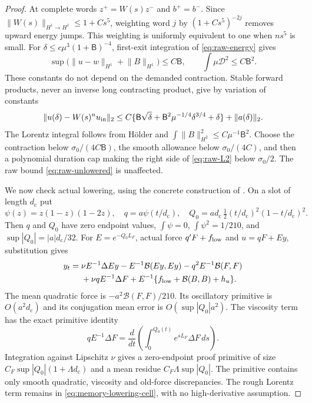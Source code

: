 \documentclass[11pt,a4paper]{amsart}
\theoremstyle{definition}
\theoremstyle{remark}
\numberwithin{equation}{section}
\newcommand{\Bcal}{\mathcal B}
\newcommand{\norm}[1]{\lVert #1\rVert}
\begin{document}
\begin{proof}
At complete words $z^+=W(s)z^-$ and $b^+=b^-$.  Since
$\norm{W(s)}_{H^1\to H^1}\le1+Cs^5$, weighting word $j$ by
$(1+Cs^5)^{-2j}$ removes upward energy jumps.  This weighting is uniformly
equivalent to one when $ns^5$ is small.  For
$\delta\le c\mu^3(1+\mathsf B)^{-4}$, first-exit integration of
\eqref{eq:raw-energy} gives
\begin{equation}\label{eq:raw-unlowered}
 \sup\bigl(\norm{u-w}_{H^1}+\norm B_{H^1}\bigr)\le C\mathsf B,
 \qquad\int\mu\mathcal D^2\le C\mathsf B^2.
\end{equation}
These constants do not depend on the demanded contraction.
Stable forward products, never an inverse long contracting product,
give by variation of constants
\begin{equation}\label{eq:raw-L2}
 \norm{u(\delta)-W(s)^nu_{\rm in}}_2
 \le C\{\mathsf B\sqrt\delta+
    \mathsf B^2\mu^{-1/4}\delta^{3/4}+\delta\}
          +\norm{a(\delta)}_2.
\end{equation}
The Lorentz integral follows from H\"older and
$\int\norm B_{H^2}^2\le C\mu^{-1}\mathsf B^2$.
Choose the contraction below $\sigma_0/(4C\mathsf B)$, the smooth
allowance below $\sigma_0/(4C)$, and then a polynomial duration cap making
the right side of \eqref{eq:raw-L2} below $\sigma_0/2$.
The raw bound \eqref{eq:raw-unlowered} is unaffected.

We now check actual lowering, using the concrete construction of
\cite[Section~8.6]{Common}.  On a slot of length $d_{\mathrm c}$ put
\[
 \psi(z)=z(1-z)(1-2z),\quad q=a\psi(t/d_{\mathrm c}),\quad
 Q_0=ad_{\mathrm c}\,\tfrac12(t/d_{\mathrm c})^2(1-t/d_{\mathrm c})^2.
\]
Then $q$ and $Q_0$ have zero endpoint values, $\int\psi=0$,
$\int\psi^2=1/210$, and $\sup|Q_0|=|a|d_{\mathrm c}/32$.
For $E=e^{-Q_0L_F}$, actual force $q'F+f_{\rm low}$ and
$u=qF+Ey$, substitution gives
\begin{align}\label{eq:memory-lowering-cell}
 y_t={}&\nu E^{-1}\Delta Ey-E^{-1}\Bcal(Ey,Ey)
             -q^2E^{-1}\Bcal(F,F)\notag\\
 &+\nu qE^{-1}\Delta F
             +E^{-1}\{f_{\rm low}+\Bcal(B,B)+h_u\}.
\end{align}
The mean quadratic force is $-a^2\Bcal(F,F)/210$.
Its oscillatory primitive is $O(a^2d_{\mathrm c})$ and its conjugation mean error is
$O(\sup|Q_0|a^2)$.  The viscosity term has the exact primitive identity
\begin{equation}\label{eq:memory-viscosity-primitive}
 qE^{-1}\Delta F
 =\frac d{dt}\left(\int_0^{Q_0(t)}e^{sL_F}\Delta F\,ds\right).
\end{equation}
Integration against Lipschitz $\nu$ gives a zero-endpoint proof primitive
of size $C_F\sup|Q_0|(1+\Lambda d_{\mathrm c})$ and a mean residue
$C_F\Lambda\sup|Q_0|$.  The primitive contains only smooth quadratic,
viscosity and old-force discrepancies.  The rough Lorentz term remains
in \eqref{eq:memory-lowering-cell}, with no high-derivative assumption.


\end{proof}
\end{document}
